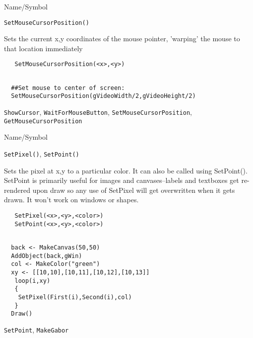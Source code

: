 \rl


\begin{desc}{Name/Symbol}
\item[Name/Symbol]	\verb+SetMouseCursorPosition()+

\item[Description] Sets the current x,y coordinates of the mouse
  pointer, 'warping' the mouse to that location immediately

\item[Usage]
\begin{verbatim}
   SetMouseCursorPosition(<x>,<y>)
\end{verbatim}

\item[Example]	
\begin{verbatim}

  ##Set mouse to center of screen:
  SetMouseCursorPosition(gVideoWidth/2,gVideoHeight/2)
\end{verbatim}


\item[See Also]
  \verb+ShowCursor+, \verb+WaitForMouseButton+,
  \verb+SetMouseCursorPosition+, \verb+GetMouseCursorPosition+
\end{desc}

\rl


\begin{desc}{Name/Symbol}
\item[Name/Symbol]	\verb+SetPixel()+, \verb+SetPoint()+

\item[Description] Sets the pixel at x,y to a particular color.  It
  can also be called using SetPoint().  SetPoint is primarily useful
  for images and canvases--labels and textboxes get re-rendered upon
  draw so any use of SetPixel will get overwritten when it gets
  drawn.  It won't work on windows or shapes.

\item[Usage]
\begin{verbatim}
   SetPixel(<x>,<y>,<color>)
   SetPoint(<x>,<y>,<color>)
\end{verbatim}

\item[Example]	
\begin{verbatim}

  back <- MakeCanvas(50,50)
  AddObject(back,gWin)
  col <- MakeColor("green")
  xy <- [[10,10],[10,11],[10,12],[10,13]]
   loop(i,xy)
   {
    SetPixel(First(i),Second(i),col)
   }
  Draw()
\end{verbatim}


\item[See Also]
  \verb+SetPoint+, \verb+MakeGabor+
\end{desc}

